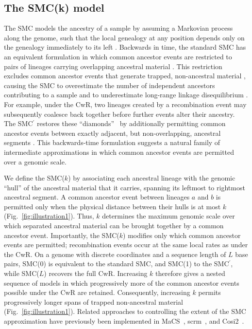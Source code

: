 \documentclass[9pt,twocolumn,twoside,lineno]{gsajnl}
\begin{document}
\subsection{The SMC(k) model}

The SMC models the ancestry of a sample by assuming a Markovian process along
the genome, such that the local genealogy at any position depends only on the
genealogy immediately to its left \citep{mcvean_approximating_2005}. Backwards
in time, the standard SMC has an equivalent formulation in which common
ancestor events are restricted to pairs of lineages carrying overlapping
ancestral material
\citep{mcvean_approximating_2005,bisschop_likelihoods_2025}.
This restriction excludes common ancestor events that generate trapped,
non-ancestral material \citep{wiuf1999ancestry}, causing the SMC to
overestimate the number of independent ancestors contributing to a sample and
to underestimate long-range linkage disequilibrium
\citep{marjoram_fast_2006}. For example, under the CwR, two lineages created by
a recombination event may subsequently coalesce back together before further
events alter their ancestry.
The SMC$^\prime$ restores these
``diamonds''~\citep{rasmussen2014genome}
by additionally permitting common ancestor events between exactly adjacent,
but non-overlapping, ancestral segments \citep{marjoram_fast_2006}. This
backwards-time formulation suggests a natural family of intermediate
approximations in which common ancestor events are permitted over a
genomic scale.

We define the SMC($k$) by associating each ancestral lineage with the genomic
``hull''
of the ancestral material that it carries, spanning its leftmost to rightmost
ancestral segment. A common ancestor event between lineages $a$ and $b$ is
permitted only when the physical distance between their hulls is at most $k$
(Fig.~\ref{fig:illustration1}). Thus, $k$ determines the maximum genomic scale
over which separated ancestral material can be brought together by a common
ancestor event. Importantly, the SMC($k$) modifies only which common ancestor events
are permitted; recombination events occur at the same local rates as under the
CwR. On a genome with discrete coordinates and a sequence length of $L$
base pairs,
SMC(0) is equivalent to the standard SMC, and
SMC(1) to the SMC$^\prime$, while SMC($L$) recovers the full CwR.
Increasing $k$ therefore gives a nested sequence of
models in which progressively more of the common ancestor events possible
under the CwR are retained. Consequently, increasing $k$ permits progressively
longer spans of trapped non-ancestral material (Fig.~\ref{fig:illustration1}).
Related approaches to controlling the extent of the SMC approximation have
previously been implemented in MaCS~\citep{chen_fast_2009},
scrm~\citep{staab_scrm_2015}, and Cosi2~\citep{shlyakhter_cosi2_2014}.
\end{document}
